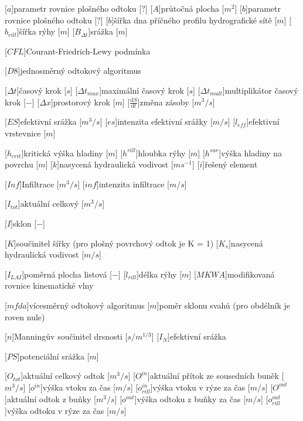 \begin{acronym}
\setlength{\parskip}{0ex}
\setlength{\itemsep}{1ex}

[$a$]{parametr rovnice plošného odtoku [$?$]}
[$A$]{průtočná plocha  [$m^{2}$]}
[$b$]{parametr rovnice plošného odtoku [$?$]}
[$b$]{šířka dna příčného profilu hydrografické sítě [$m$]}
[$b_{rill}$]{šířka rýhy [$m$]}
[$B_{\Delta t}$]{srážka [$m$]}

[$CFL$]{Courant-Friedrich-Lewy podmínka}


[$D8$]{jednosměrný odtokový algoritmus}

[$\Delta t$]{časový krok [$s$]}
[$\Delta t_{max}$]{maximální časový krok [$s$]}
[$\Delta t_{mult}$]{multiplikátor časový krok [$-$]}
[$\Delta x$]{prostorový krok [$m$]}
[$\frac{\mathrm{d}S}{\mathrm{d}t}$]{změna zásoby [$m^3/s$]}

[$ES$]{efektivní srážka [$m^3/s$]}
[$es$]{intenzita efektivní srážky [$m/s$]}
[$l_{eff}$]{efektivní vrstevnice [$m$]}

[$h_{crit}$]{kritická výška hladiny [$m$]}
[$h^{rill}$]{hloubka rýhy [$m$]}
[$h^{sur}$]{výška hladiny na povrchu [$m$]}
[$k$]{nasycená hydraulická vodivost [$m s^{-1}$]}
[$i$]{řešený element}

[$Inf$]{Infiltrace [$m^3/s$]}
[$inf$]{intenzita infiltrace [$m/s$]}

[$I_{tot}$]{aktuální celkový [$m^3/s$]}

[$I$]{sklon [$-$]}

[$K$]{součinitel šířky (pro plošný povrchový odtok je K = 1)}
[$K_s$]{nasycená hydraulická vodivost [$m/s$]}

[$I_{LAI}$]{poměrná plocha listová [$-$]}
[$l_{rill}$]{délka rýhy [$m$]}
[$MKWA$]{modifikovaná rovnice kinematické vlny}

[$mfda$]{vícesměrný odtokový algoritmus}
[$m$]{poměr sklonu svahů (pro obdélník je roven nule)}

[$n$]{Manningův součinitel drsnosti [$s/m^{1/3}$]}
[$I_{N}$]{efektivní srážka}

[$PS$]{potenciální srážka [$m$]}

[$O_{tot}$]{aktuální celkový odtok [$m^{3}/s$]}
[$O^{in}$]{aktuální přítok ze sousedních buněk [$m^{3}/s$]}
[$o^{in}$]{výška vtoku za čas [$m/s$]}
[$o^{in}_{rill}$]{výška vtoku v rýze za čas [$m/s$]}
[$O^{out}$]{aktuální odtok z buňky [$m^{3}/s$]}
[$o^{out}$]{výška odtoku z buňky  za čas [$m/s$]}
[$o^{out}_{rill}$]{výška odtoku v rýze za čas [$m/s$]}



\end{acronym}
